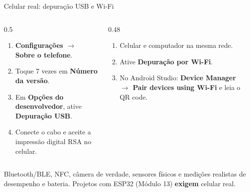 \documentclass[aspectratio=169,10pt]{beamer}
\begin{document}
\begin{frame}{Celular real: depuração USB e Wi-Fi}
  \begin{columns}[T]
    \begin{column}{0.5\textwidth}
      \begin{conceito}
        \begin{enumerate}
          \item \textbf{Configurações $\rightarrow$ Sobre o telefone}.
          \item Toque 7 vezes em \textbf{Número da versão}.
          \item Em \textbf{Opções do desenvolvedor}, ative \textbf{Depuração USB}.
          \item Conecte o cabo e aceite a impressão digital RSA no celular.
        \end{enumerate}
      \end{conceito}
    \end{column}
    \begin{column}{0.48\textwidth}
      \begin{conceito}
        \begin{enumerate}
          \item Celular e computador na mesma rede.
          \item Ative \textbf{Depuração por Wi-Fi}.
          \item No Android Studio: \textbf{Device Manager $\rightarrow$ Pair devices using Wi-Fi} e leia o QR code.
        \end{enumerate}
      \end{conceito}
    \end{column}
  \end{columns}
  \begin{atencao}
    Bluetooth/BLE, NFC, câmera de verdade, sensores físicos e medições realistas de desempenho e bateria. Projetos com ESP32 (Módulo 13) \textbf{exigem} celular real.
  \end{atencao}
\end{frame}
\end{document}
